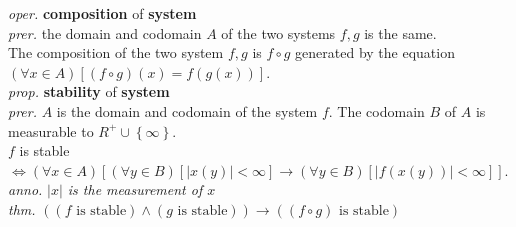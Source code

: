 \documentclass[16pt]{article}
\newcommand{\sd}[1]{{\left(#1\right)}}
\newcommand{\thm}[1]{\emph{thm.} #1}
\newcommand{\anno}[1]{\emph{anno.} \emph{#1}}
\newcommand{\md}[1]{{\left[#1\right]}}
\newcommand{\ld}[1]{{\left\{#1\right\}}}
\newcommand{\prer}[1]{\emph{prer.} #1}
\newcommand{\oper}[2]{\emph{oper.} \textbf{#1} of \textbf{#2}}
\newcommand{\prop}[2]{\emph{prop.} \textbf{#1} of \textbf{#2}}
\newcommand{\abs}[1]{{\left|#1\right|}}
\begin{document}
\oper{composition}{system}\\
\prer{the domain and codomain $A$ of the two systems $f,g$ is the same.}\\
The composition of the two system $f,g$ is $f\circ g$ generated by the equation $\sd{\forall x \in A}\md{\sd{f\circ g}\sd{x} = f\sd{g\sd{x}}}$.\\
\prop{stability}{system}\\
\prer{$A$ is the domain and codomain of the system $f$. The codomain $B$ of $A$ is measurable to $R^{+}\cup\ld{\infty}$.}\\
$f$ is stable $\iff \sd{\forall x \in A}\md{\sd{\forall y \in B}\md{\abs{x\sd{y}} < \infty} \to \sd{\forall y \in B}\md{\abs{f\sd{x\sd{y}}} < \infty}}$.\\
\anno{$\abs{x}$ is the measurement of $x$}\\
\thm{$\sd{\sd{f\text{ is stable}}\land\sd{g\text{ is stable}}} \to \sd{\sd{f \circ g}\text{ is stable}}$}\\
\end{document}
